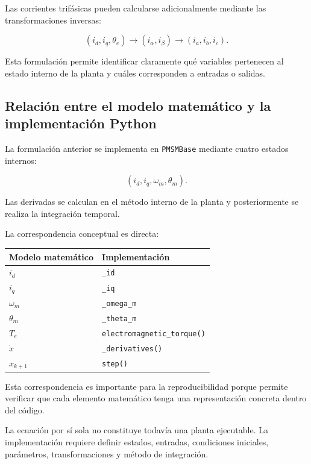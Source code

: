 Las corrientes trifásicas pueden calcularse adicionalmente mediante las transformaciones inversas:

\begin{equation}
(i_d,i_q,\theta_e)
\rightarrow
(i_\alpha,i_\beta)
\rightarrow
(i_a,i_b,i_c).
\end{equation}

Esta formulación permite identificar claramente qué variables pertenecen al estado interno de la planta y cuáles corresponden a entradas o salidas.

\subsection{Relación entre el modelo matemático y la implementación Python}

La formulación anterior se implementa en \texttt{PMSMBase} mediante cuatro estados internos:

\begin{equation}
(i_d,i_q,\omega_m,\theta_m).
\end{equation}

Las derivadas se calculan en el método interno de la planta y posteriormente se realiza la integración temporal.

La correspondencia conceptual es directa:

\begin{center}
\begin{tabular}{ll}
\textbf{Modelo matemático} & \textbf{Implementación} \\
\hline
$i_d$ & \texttt{\_id} \\
$i_q$ & \texttt{\_iq} \\
$\omega_m$ & \texttt{\_omega\_m} \\
$\theta_m$ & \texttt{\_theta\_m} \\
$T_e$ & \texttt{electromagnetic\_torque()} \\
$\dot{x}$ & \texttt{\_derivatives()} \\
$x_{k+1}$ & \texttt{step()} \\
\end{tabular}
\end{center}

Esta correspondencia es importante para la reproducibilidad porque permite verificar que cada elemento matemático tenga una representación concreta dentro del código.

La ecuación por sí sola no constituye todavía una planta ejecutable. La implementación requiere definir estados, entradas, condiciones iniciales, parámetros, transformaciones y método de integración.

